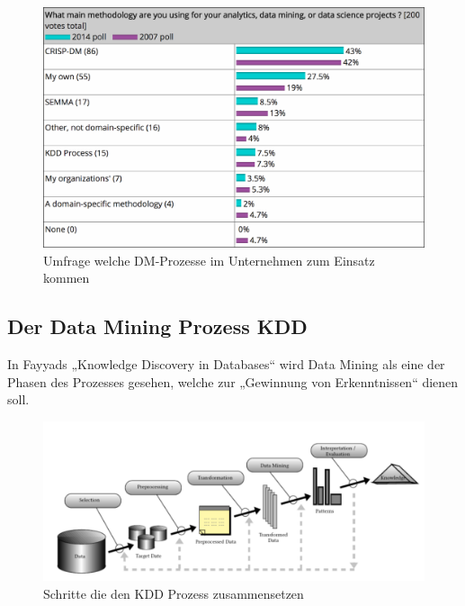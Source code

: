 \begin{figure}[htb]
	\includegraphics[width=\textwidth]{gfx/dmprocesses.png}
	\caption{Umfrage welche DM-Prozesse im Unternehmen zum Einsatz kommen \cite{KDN}}
	\label{fig:process:alt:cor}
\end{figure}

\subsection{Der Data Mining Prozess KDD}
\label{sec:process:alt:kdd}

In Fayyads „Knowledge Discovery in Databases“ \cite{FAY:96} wird Data Mining als
eine der Phasen des  Prozesses gesehen, welche zur „Gewinnung von Erkenntnissen“
dienen soll.

\begin{figure}[htb]
	\includegraphics[width=\textwidth]{gfx/kdd.png}
	\caption{Schritte die den KDD Prozess zusammensetzen \cite{FAY:96}}
	\label{fig:process:alt:cor}
\end{figure}

